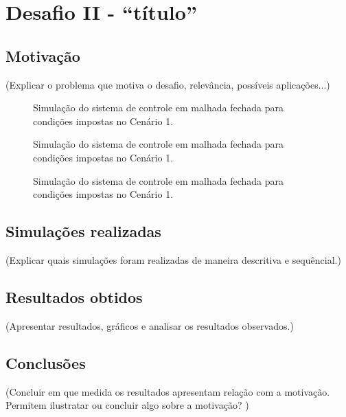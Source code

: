 \section{Desafio II - ``título''} 
 
\subsection{Motivação}
(Explicar o problema que motiva o desafio, relevância, possíveis aplicações...)

\begin{figure}[!ht]
    \caption{Simulação do sistema de controle em malhada fechada para condições
    impostas no Cenário 1.}
    \vspace{-10pt}
    \hspace{-30pt}
    \label{fig:resultado-desafio2-questao5}
    \begin{minipage}{\linewidth}
        
    \end{minipage}
\end{figure}

\begin{figure}[!ht]
    \caption{Simulação do sistema de controle em malhada fechada para condições
    impostas no Cenário 1.}
    \vspace{-10pt}
    \hspace{-30pt}
    \label{fig:resultado-desafio2-questao6}
    \begin{minipage}{\linewidth}
        
    \end{minipage}
\end{figure}

\begin{figure}[!ht]
    \caption{Simulação do sistema de controle em malhada fechada para condições
    impostas no Cenário 1.}
    \vspace{-10pt}
    \hspace{-30pt}
    \label{fig:resultado-extra-desafio2-questao6}
    \begin{minipage}{\linewidth}
        
    \end{minipage}
\end{figure}

\subsection{Simulações realizadas}
(Explicar quais simulações foram realizadas de maneira descritiva e sequêncial.) 

\subsection{Resultados obtidos}
(Apresentar resultados, gráficos e analisar os resultados observados.) 

\subsection{Conclusões}
(Concluir em que medida os resultados apresentam relação com a motivação. Permitem ilustratar ou concluir algo sobre a motivação? )
